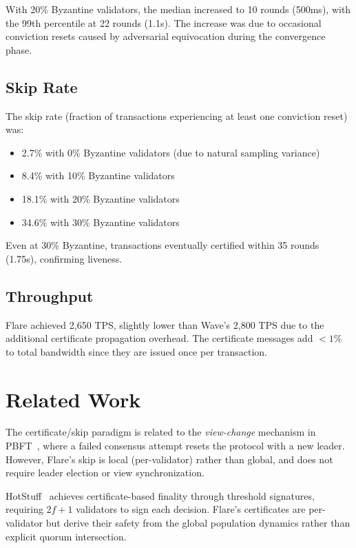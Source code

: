 \documentclass[11pt,a4paper]{article}
\begin{document}
With 20\% Byzantine validators, the median increased to 10 rounds (500ms), with the
99th percentile at 22 rounds (1.1s). The increase was due to occasional conviction
resets caused by adversarial equivocation during the convergence phase.

\subsection{Skip Rate}

The skip rate (fraction of transactions experiencing at least one conviction reset)
was:
\begin{itemize}[nosep]
\item 2.7\% with 0\% Byzantine validators (due to natural sampling variance)
\item 8.4\% with 10\% Byzantine validators
\item 18.1\% with 20\% Byzantine validators
\item 34.6\% with 30\% Byzantine validators
\end{itemize}

Even at 30\% Byzantine, transactions eventually certified within 35 rounds (1.75s),
confirming liveness.

\subsection{Throughput}

Flare achieved 2,650 TPS, slightly lower than Wave's 2,800 TPS due to the additional
certificate propagation overhead. The certificate messages add $< 1\%$ to total
bandwidth since they are issued once per transaction.

\section{Related Work}
\label{sec:related}

The certificate/skip paradigm is related to the \emph{view-change} mechanism in
PBFT~\cite{castro1999practical}, where a failed consensus attempt resets the protocol
with a new leader. However, Flare's skip is local (per-validator) rather than global,
and does not require leader election or view synchronization.

HotStuff~\cite{yin2019hotstuff} achieves certificate-based finality through threshold
signatures, requiring $2f+1$ validators to sign each decision. Flare's certificates are
per-validator but derive their safety from the global population dynamics rather than
explicit quorum intersection.
\end{document}
